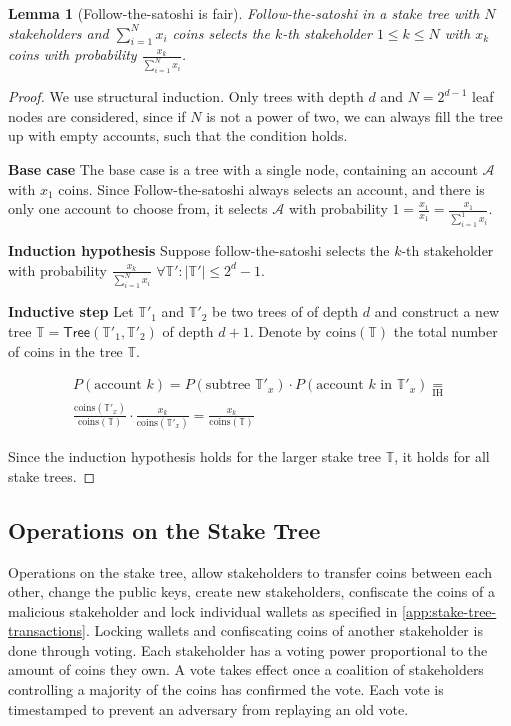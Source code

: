 \documentclass{style/kththesis}
\newtheorem{lemma}{Lemma}
\begin{document}
\begin{lemma}[Follow-the-satoshi is fair]
Follow-the-satoshi in a stake tree with $N$ stakeholders and $\sum_{i=1}^{N}{x_i}$ coins selects the $k$-th stakeholder $1 \le k \le N$ with $x_k$ coins with probability $\frac{x_k}{\sum_{i=1}^{N}{x_i}}$.
\end{lemma}
\begin{proof}
We use structural induction. Only trees with depth $d$ and $N = 2^{d-1}$ leaf nodes are considered, since if $N$ is not a power of two, we can always fill the tree up with empty accounts, such that the condition holds.

\noindent
\textbf{Base case} The base case is a tree with a single node, containing an account $\mathcal{A}$ with $x_1$ coins. Since Follow-the-satoshi always selects an account, and there is only one account to choose from, it selects $\mathcal{A}$ with probability $1 = \frac{x_1}{x_1} = \frac{x_1}{\sum_{i=1}^{1}{x_i}}$.

\noindent 
\textbf{Induction hypothesis} Suppose follow-the-satoshi selects the $k$-th stakeholder with probability $\frac{x_k}{\sum_{i=1}^{N}{x_i}}$ $\forall \mathbb{T'} : |\mathbb{T'}| \le 2^{d} - 1$.

\noindent \textbf{Inductive step} Let $\mathbb{T'}_1$ and $\mathbb{T'}_2$ be two trees of of depth $d$ and construct a new tree $\mathbb{T} = \mathsf{Tree}(\mathbb{T'}_1, \mathbb{T'}_2)$ of depth $d + 1$. Denote by $\text{coins}(\mathbb{T})$ the total number of coins in the tree $\mathbb{T}$.

\begin{align*}
P(\text{account~}k) = P(\text{subtree~} \mathbb{T'}_x) \cdot P(\text{account~}k\text{~in~}\mathbb{T'}_x) \underset{\text{IH}}{=} \\ \frac{\text{coins}(\mathbb{T'}_x)}{\text{coins}(\mathbb{T})} \cdot \frac{x_k}{\text{coins}(\mathbb{T'}_x)} = \frac{x_k}{\text{coins}(\mathbb{T})}    
\end{align*}

\noindent Since the induction hypothesis holds for the larger stake tree $\mathbb{T}$, it holds for all stake trees.
\end{proof}

\subsection{Operations on the Stake Tree}
\label{stake-tree-operations}
Operations on the stake tree, allow stakeholders to transfer coins between each other, change the public keys, create new stakeholders, confiscate the coins of a malicious stakeholder and lock individual wallets as specified in \cref{app:stake-tree-transactions}. Locking wallets and confiscating coins of another stakeholder is done through voting. Each stakeholder has a voting power proportional to the amount of coins they own. A vote takes effect once a coalition of stakeholders controlling a majority of the coins has confirmed the vote. Each vote is timestamped to prevent an adversary from replaying an old vote.
\end{document}
